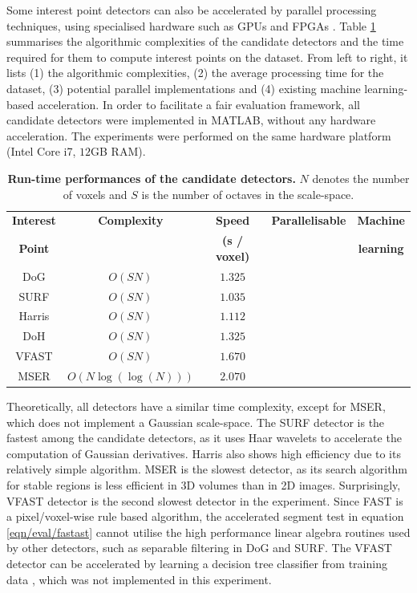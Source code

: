 Some interest point detectors can also be accelerated by parallel processing techniques, using specialised hardware such as GPUs and FPGAs \cite{Sinha2006, Cornelis2008, Teixeira2008, Bhatia2007, Dohi2011, Kristensen2007}. Table \ref{tab/eval/speedtable} summarises the algorithmic complexities of the candidate detectors and the time required for them to compute interest points on the \meshset dataset. From left to right, it lists (1) the algorithmic complexities, (2) the average processing time for the \meshset dataset, (3) potential parallel implementations and (4) existing machine learning-based acceleration. 
In order to facilitate a fair evaluation framework, all candidate detectors were implemented in MATLAB, without any hardware acceleration. The experiments were performed on the same hardware platform (Intel Core i7, $12$GB RAM). 

\begin{table}
\centering
\begin{tabular}{|c|cccc|}
\hline
\textbf{Interest} & \textbf{Complexity} & \textbf{Speed} & \textbf{Parallelisable} & \textbf{Machine} \\
\textbf{Point} & & \textbf{(\bm{$\mu$}s / voxel)} & & \textbf{learning} 	\\ 	
\hline
DoG 		& $O(SN)$ 			& $1.325 $ 			& \checkmark \cite{Sinha2006} & \\
SURF 		& $O(SN)$ 			& $1.035 $ 			& \checkmark \cite{Cornelis2008} & \\
Harris 		& $O(SN)$ 			& $1.112 $ 			& \checkmark \cite{Teixeira2008} & \\
DoH			& $O(SN)$ 			& $1.325 $ 			& \checkmark \cite{Bhatia2007} & \\
VFAST 		& $O(SN)$ 			& $1.670 $ 			& \checkmark \cite{Dohi2011} & \checkmark \cite{Rosten2010}\\
MSER 		& $O(N\log(\log(N)))$ 	& $2.070 $ 			& \checkmark \cite{Kristensen2007} &\\
\hline
\end{tabular}
\caption{\textbf{Run-time performances of the candidate detectors.} $N$ denotes the number of voxels and $S$ is the number of octaves in the scale-space.}
\label{tab/eval/speedtable}
\end{table}

Theoretically, all detectors have a similar time complexity, except for MSER, which does not implement a Gaussian scale-space. The SURF detector is the fastest among the candidate detectors, as it uses Haar wavelets to accelerate the computation of Gaussian derivatives. Harris also shows high efficiency due to its relatively simple algorithm. MSER is the slowest detector, as its search algorithm for stable regions is less efficient in 3D volumes than in 2D images. Surprisingly, VFAST detector is the second slowest detector in the experiment. Since FAST is a pixel/voxel-wise rule based algorithm, the accelerated segment test in equation \ref{eqn/eval/fastast} cannot utilise the high performance linear algebra routines used by other detectors, such as separable filtering in DoG and SURF. The VFAST detector can be accelerated by learning a decision tree classifier from training data \cite{Rosten2010}, which was not implemented in this experiment.

